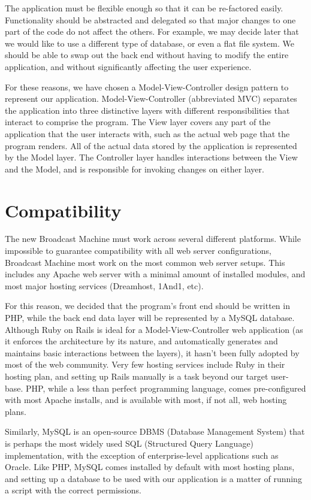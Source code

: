 \documentclass[a4paper,12pt]{report}
\begin{document}
The application must be flexible enough so that it can be re-factored easily. Functionality should be abstracted and delegated so that major changes to one part of the code do not affect the others. For example, we may decide later that we would like to use a different type of database, or even a flat file system. We should be able to swap out the back end without having to modify the entire application, and without significantly affecting the user experience.

For these reasons, we have chosen a Model-View-Controller design pattern to represent our application. Model-View-Controller (abbreviated MVC) separates the application into three distinctive layers with different responsibilities that interact to comprise the program. The View layer covers any part of the application that the user interacts with, such as the actual web page that the program renders. All of the actual data stored by the application is represented by the Model layer. The Controller layer handles interactions between the View and the Model, and is responsible for invoking changes on either layer.

\section{Compatibility}

The new Broadcast Machine must work across several different platforms. While impossible to guarantee compatibility with all web server configurations, Broadcast Machine most work on the most common web server setups. This includes any Apache web server with a minimal amount of installed modules, and most major hosting services (Dreamhost, 1And1, etc). 

For this reason, we decided that the program’s front end should be written in PHP, while the back end data layer will be represented by a MySQL database. Although Ruby on Rails is ideal for a Model-View-Controller web application (as it enforces the architecture by its nature, and automatically generates and maintains basic interactions between the layers), it hasn’t been fully adopted by most of the web community. Very few hosting services include Ruby in their hosting plan, and setting up Rails manually is a task beyond our target user-base. PHP, while a less than perfect programming language, comes pre-configured with most Apache installs, and is available with most, if not all, web hosting plans. 

Similarly, MySQL is an open-source DBMS (Database Management System) that is perhaps the most widely used SQL (Structured Query Language) implementation, with the exception of enterprise-level applications such as Oracle. Like PHP, MySQL comes installed by default with most hosting plans, and setting up a database to be used with our application is a matter of running a script with the correct permissions. 
\end{document}
